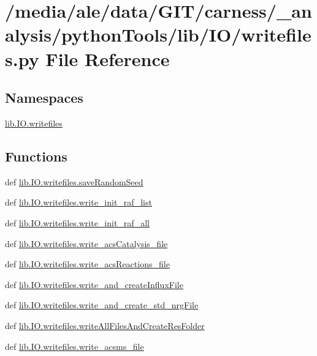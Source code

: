\hypertarget{a00057}{\section{/media/ale/data/\-G\-I\-T/carness/\-\_\-analysis/python\-Tools/lib/\-I\-O/writefiles.py File Reference}
\label{a00057}
}
\subsection*{Namespaces}
\begin{DoxyCompactItemize}
\item 
\hyperlink{a00114}{lib.\-I\-O.\-writefiles}
\end{DoxyCompactItemize}
\subsection*{Functions}
\begin{DoxyCompactItemize}
\item 
def \hyperlink{a00114_a7fddc2c2879e8fedd8fbb345a19aa6f6}{lib.\-I\-O.\-writefiles.\-save\-Random\-Seed}
\item 
def \hyperlink{a00114_a33a9a95566de3841055c5dbf7fdc3505}{lib.\-I\-O.\-writefiles.\-write\-\_\-init\-\_\-raf\-\_\-list}
\item 
def \hyperlink{a00114_ad13fc2e762b8deaeb661f939e26e706f}{lib.\-I\-O.\-writefiles.\-write\-\_\-init\-\_\-raf\-\_\-all}
\item 
def \hyperlink{a00114_af18d8f2d2d0fc78ca4418866631f347b}{lib.\-I\-O.\-writefiles.\-write\-\_\-acs\-Catalysis\-\_\-file}
\item 
def \hyperlink{a00114_adbff7889ebd8786ecf5791e8a7b00d59}{lib.\-I\-O.\-writefiles.\-write\-\_\-acs\-Reactions\-\_\-file}
\item 
def \hyperlink{a00114_ae2842322fe821ae86172affce98f3aa1}{lib.\-I\-O.\-writefiles.\-write\-\_\-and\-\_\-create\-Influx\-File}
\item 
def \hyperlink{a00114_a395b3244d381850f60bf1ee95dbe84dd}{lib.\-I\-O.\-writefiles.\-write\-\_\-and\-\_\-create\-\_\-std\-\_\-nrg\-File}
\item 
def \hyperlink{a00114_a57622287d0b21cb0fe09d15345277c5c}{lib.\-I\-O.\-writefiles.\-write\-All\-Files\-And\-Create\-Res\-Folder}
\item 
def \hyperlink{a00114_a593c166784723a06f4f6a1a96890aa17}{lib.\-I\-O.\-writefiles.\-write\-\_\-acsms\-\_\-file}
\end{DoxyCompactItemize}
